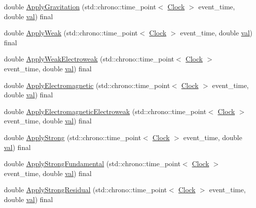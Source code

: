\begin{DoxyCompactItemize}
double \mbox{\hyperlink{class_law_a04efdc724335219ab0affdcffb55eea2}{Apply\+Gravitation}} (std\+::chrono\+::time\+\_\+point$<$ \mbox{\hyperlink{universe_8h_a0ef8d951d1ca5ab3cfaf7ab4c7a6fd80}{Clock}} $>$ event\+\_\+time, double \mbox{\hyperlink{glad_8h_a26942fd2ed566ef553eae82d2c109c8f}{val}}) final
\item 
double \mbox{\hyperlink{class_law_a96ddd42403e3665c6070283ac201658d}{Apply\+Weak}} (std\+::chrono\+::time\+\_\+point$<$ \mbox{\hyperlink{universe_8h_a0ef8d951d1ca5ab3cfaf7ab4c7a6fd80}{Clock}} $>$ event\+\_\+time, double \mbox{\hyperlink{glad_8h_a26942fd2ed566ef553eae82d2c109c8f}{val}}) final
\item 
double \mbox{\hyperlink{class_law_ae8a5d1d09686d79f7814c8800791460b}{Apply\+Weak\+Electroweak}} (std\+::chrono\+::time\+\_\+point$<$ \mbox{\hyperlink{universe_8h_a0ef8d951d1ca5ab3cfaf7ab4c7a6fd80}{Clock}} $>$ event\+\_\+time, double \mbox{\hyperlink{glad_8h_a26942fd2ed566ef553eae82d2c109c8f}{val}}) final
\item 
double \mbox{\hyperlink{class_law_a418791aee2a9204a99d3a917b86fafd3}{Apply\+Electromagnetic}} (std\+::chrono\+::time\+\_\+point$<$ \mbox{\hyperlink{universe_8h_a0ef8d951d1ca5ab3cfaf7ab4c7a6fd80}{Clock}} $>$ event\+\_\+time, double \mbox{\hyperlink{glad_8h_a26942fd2ed566ef553eae82d2c109c8f}{val}}) final
\item 
double \mbox{\hyperlink{class_law_a4485046db890a95cea16573042a4f4f6}{Apply\+Electromagnetic\+Electroweak}} (std\+::chrono\+::time\+\_\+point$<$ \mbox{\hyperlink{universe_8h_a0ef8d951d1ca5ab3cfaf7ab4c7a6fd80}{Clock}} $>$ event\+\_\+time, double \mbox{\hyperlink{glad_8h_a26942fd2ed566ef553eae82d2c109c8f}{val}}) final
\item 
double \mbox{\hyperlink{class_law_ab38659b209055df7e59f4bcd1b9e545a}{Apply\+Strong}} (std\+::chrono\+::time\+\_\+point$<$ \mbox{\hyperlink{universe_8h_a0ef8d951d1ca5ab3cfaf7ab4c7a6fd80}{Clock}} $>$ event\+\_\+time, double \mbox{\hyperlink{glad_8h_a26942fd2ed566ef553eae82d2c109c8f}{val}}) final
\item 
double \mbox{\hyperlink{class_law_a57d05f26e1c0ee953260ebd3780248f8}{Apply\+Strong\+Fundamental}} (std\+::chrono\+::time\+\_\+point$<$ \mbox{\hyperlink{universe_8h_a0ef8d951d1ca5ab3cfaf7ab4c7a6fd80}{Clock}} $>$ event\+\_\+time, double \mbox{\hyperlink{glad_8h_a26942fd2ed566ef553eae82d2c109c8f}{val}}) final
\item 
double \mbox{\hyperlink{class_law_a266f86cdcc01e813249a2f192ab85eb3}{Apply\+Strong\+Residual}} (std\+::chrono\+::time\+\_\+point$<$ \mbox{\hyperlink{universe_8h_a0ef8d951d1ca5ab3cfaf7ab4c7a6fd80}{Clock}} $>$ event\+\_\+time, double \mbox{\hyperlink{glad_8h_a26942fd2ed566ef553eae82d2c109c8f}{val}}) final

\end{DoxyCompactItemize}
